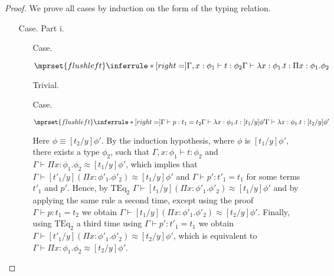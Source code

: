 \begin{proof}
  We prove all cases by induction on the form of the typing relation.

\begin{itemize}
\item[Case.] Part i.\\
  \begin{itemize}
  \item[Case.] \ \\
    \begin{center}
      \begin{math}
        $$\mprset{flushleft}
        \inferrule* [right=] {
          \Gamma,x : \phi_1 \vdash t : \phi_2
        }{\Gamma \vdash \lambda x : \phi_1.t : \Pi x:\phi_1.\phi_2}
      \end{math}
    \end{center}
    Trivial.
  
  \item[Case.] \ \\
    \begin{center}
      \begin{math}
        $$\mprset{flushleft}
        \inferrule* [right=] {
          \Gamma \vdash p:t_1 = t_2
          \\
          \Gamma \vdash \lambda x : \phi_1.t:[t_1/y]\phi'
        }{\Gamma \vdash \lambda x : \phi_1.t:[t_2/y]\phi'}
      \end{math}
    \end{center}
    Here $\phi \equiv [t_2/y]\phi'$.  By the induction hypothesis, where $\phi$ is 
    $[t_1/y]\phi'$, there exists a type $\phi_2$, such that $\Gamma,x:\phi_1 \vdash t:\phi_2$ and
    $\Gamma \vdash \Pi x:\phi_1.\phi_2 \approx [t_1/y]\phi'$, which implies that 
    $\Gamma \vdash [t'_1/y](\Pi x:\phi'_1.\phi'_2) \approx [t_1/y]\phi'$ and
    $\Gamma \vdash p':t'_1 = t_1$ for some terms $t'_1$ and $p'$.  Hence, by $\text{TEq}_2$
    $\Gamma \vdash [t_1/y](\Pi x:\phi'_1.\phi'_2) \approx [t_1/y]\phi'$ and by applying the same
    rule a second time, except using the proof $\Gamma \vdash p:t_1 = t_2$ we obtain
    $\Gamma \vdash [t_1/y](\Pi x:\phi'_1.\phi'_2) \approx [t_2/y]\phi'$.  Finally, using 
    $\text{TEq}_2$ a third time using $\Gamma \vdash p':t'_1 = t_1$ we obtain
    $\Gamma \vdash [t'_1/y](\Pi x:\phi'_1.\phi'_2) \approx [t_2/y]\phi'$, which is equivalent to
    $\Gamma \vdash \Pi x:\phi_1.\phi_2 \approx [t_2/y]\phi'$.
  \end{itemize}
  

\end{itemize}
\end{proof}
